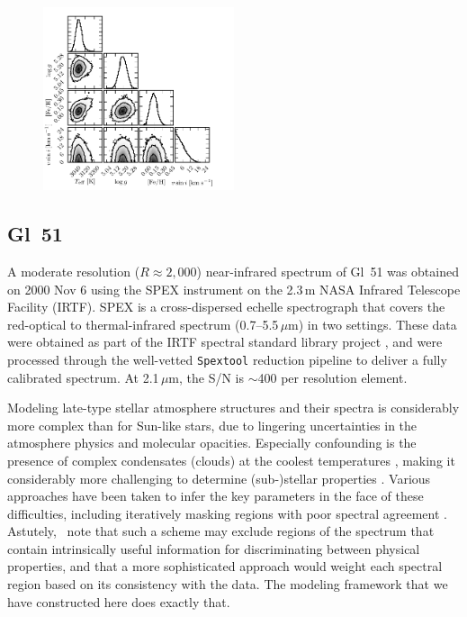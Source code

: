 \documentclass[iop,floatfix,twocolappendix]{emulateapj}
\begin{document}
\begin{figure}[!b]
  \includegraphics[width=0.5\textwidth]{figs/Gl51_triangle.pdf}
\end{figure}

\subsection{Gl~51}

A moderate resolution ($R\approx2,000$) near-infrared spectrum of Gl~51 was obtained on 2000 
Nov 6 using the SPEX instrument \citep{rayner03} on the 2.3\,m NASA Infrared Telescope Facility 
(IRTF).  SPEX is a cross-dispersed echelle spectrograph that covers the red-optical to 
thermal-infrared spectrum (0.7--5.5\,$\mu$m) in two settings.  These data were obtained as part of 
the IRTF spectral standard library project \citep{cushing05,rayner09}, and were processed through 
the well-vetted {\tt Spextool} reduction pipeline \citep{cushing04,vacca03} to deliver a fully 
calibrated spectrum.  At 2.1\,$\mu$m, the S/N is $\sim$400 per resolution element.

Modeling late-type stellar atmosphere structures and their spectra is considerably more complex 
than for Sun-like stars, due to lingering uncertainties in the atmosphere physics and molecular 
opacities.  Especially confounding is the presence of complex condensates (clouds) at the coolest 
temperatures \citep{allard13}, making it considerably more challenging to determine (sub-)stellar 
properties \citep{rajpurohit14}.  Various approaches have been taken to infer the key parameters in 
the face of these difficulties, including iteratively masking regions with poor spectral agreement 
\citep[e.g.,][]{mann13}.  Astutely, \citeauthor{mann13}~note that such a scheme may exclude 
regions of the spectrum that contain intrinsically useful information for discriminating between 
physical properties, and that a more sophisticated approach would weight each spectral region based 
on its consistency with the data.  The modeling framework that we have constructed here does 
exactly that.
\end{document}
